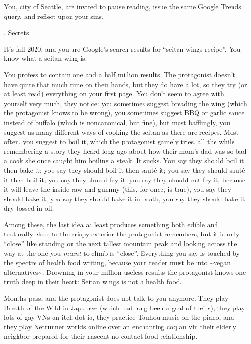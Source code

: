 \documentclass[12pt]{article}
\newcommand\chapter[2]{{\thispagestyle{empty} \Large \sc #1. \quad #2

\vspace{1.5em}}}
\begin{document}
You, city of Seattle, are invited to pause reading, issue the same Google Trends query, and reflect upon your sins.

\newpage \thispagestyle{empty}

\chapter{2}{Secrets}

It's fall 2020, and you are Google's search results for ``seitan wings recipe''.
You know what a seitan wing is.

You profess to contain one and a half million results.
The protagonist doesn't have quite that much time on their hands,
but they do have a lot, so they try (or at least read) everything on your first page.
You don't seem to agree with yourself very much, they notice:
you sometimes suggest breading the wing (which the protagonist knows to be wrong),
you sometimes suggest BBQ or garlic sauce instead of buffalo (which is noncanonical, but fine),
but most bafflingly, you suggest as many different ways of cooking the seitan as there are recipes.
Most often, you suggest to boil it,
which the protagonist gamely tries,
all the while remembering a story they heard long ago about how their mom's dad was so bad a cook she once caught him boiling a steak.
It sucks.
You say they should boil it then bake it;
you say they should boil it then saut\'e it;
you say they should saut\'e it then boil it;
you say they should fry it;
you say they should not fry it, because it will leave the inside raw and gummy (this, for once, is true),
you say they should bake it;
you say they should bake it in broth;
you say they should bake it dry tossed in oil.

Among these, the last idea at least produces something both edible and texturally close to the crispy exterior the protagonist remembers, but it is only ``close'' like standing on the next tallest mountain peak and looking across the way at the one you {\em meant} to climb is ``close''.
Everything you say is touched by the spectre of health food writing,
because your reader must be into \textasciitilde{}vegan alternatives\textasciitilde{}.
Drowning in your million useless results the protagonist knows one truth deep in their heart: Seitan wings is not a health food.

Months pass, and the protagonist does not talk to you anymore.
They play Breath of the Wild in Japanese (which had long been a goal of theirs),
they play lots of gay VNs on itch dot io,
they practice Touhou music on the piano,
and they play Netrunner worlds online over an enchanting coq au vin their elderly neighbor prepared for their nascent no-contact food relationship.
\end{document}
